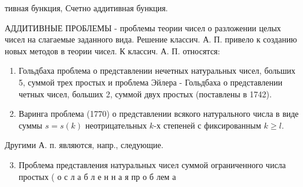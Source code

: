 \documentclass[10pt]{article}
\begin{document}
тивная бункция, Счетно аддитивная бункция.



АДДИТИВНЫЕ ПРОБЛЕМЫ - проблемы теории чисел о разложении целых чисел на слагаемые заданного вида. Решение классич. А. П. привело к созданию новых методов в теории чисел. К классич. А. П. относятся:



\begin{enumerate}

  \item Гольдбаха проблема о представлении нечетных натуральных чисел, больших 5, суммой трех простых и проблема Эйлера - Гольдбаха о представлении четных чисел, больших 2, суммой двух простых (поставлены в 1742).



  \item Варинга проблема (1770) о представлении всякого натурального числа в виде суммы $s=s(k)$ неотрицательных $k$-х степеней с фиксированным $k \geqslant l$.



\end{enumerate}



Другими А. п. являются, напр., следующие.



\begin{enumerate}

  \setcounter{enumi}{2}

  \item Проблема представления натуральных чисел суммой ограниченного числа простых ( о с л а б л е н н а я пр о б лем а

\end{enumerate}
\end{document}

